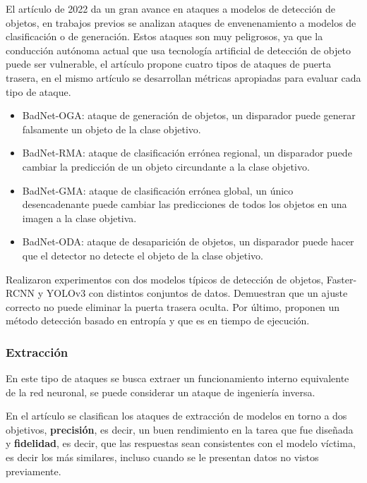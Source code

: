 El artículo \cite{chan2022baddet} de 2022 da un gran avance en ataques a modelos de detección de objetos, en trabajos previos se analizan ataques de envenenamiento a modelos de clasificación o de generación. Estos ataques son muy peligrosos, ya que la conducción autónoma actual que usa tecnología artificial de detección de objeto puede ser vulnerable, el artículo propone cuatro tipos de ataques de puerta trasera, en el mismo artículo se desarrollan métricas apropiadas para evaluar cada tipo de ataque.

\begin{itemize}
    \item \gls{BadNet-OGA}: ataque de generación de objetos, un disparador puede generar falsamente un objeto de la clase objetivo.
    \item \gls{BadNet-RMA}: ataque de clasificación errónea regional, un disparador puede cambiar la predicción de un objeto circundante a la clase objetivo.
    \item \gls{BadNet-GMA}: ataque de clasificación errónea global, un único desencadenante puede cambiar las predicciones de todos los objetos en una imagen a la clase objetiva.
    \item \gls{BadNet-ODA}: ataque de desaparición de objetos, un disparador puede hacer que el detector no detecte el objeto de la clase objetivo.
\end{itemize}

Realizaron experimentos con dos modelos típicos de detección de objetos, Faster-RCNN \cite{ren2016faster} y YOLOv3 \cite{redmon2018yolov3} con distintos conjuntos de datos. Demuestran que un ajuste correcto no puede eliminar la puerta trasera oculta. Por último, proponen un método detección basado en entropía y que es en tiempo de ejecución.


\subsubsection{Extracción}

En este tipo de ataques se busca extraer un funcionamiento interno equivalente de la red neuronal, se puede considerar un ataque de ingeniería inversa.

En el artículo \cite{jagielski2020high} se clasifican los ataques de extracción de modelos en torno a dos objetivos, \textbf{precisión}, es decir, un buen rendimiento en la tarea que fue diseñada y \textbf{fidelidad}, es decir, que las respuestas sean consistentes con el modelo víctima, es decir los más similares, incluso cuando se le presentan datos no vistos previamente.

